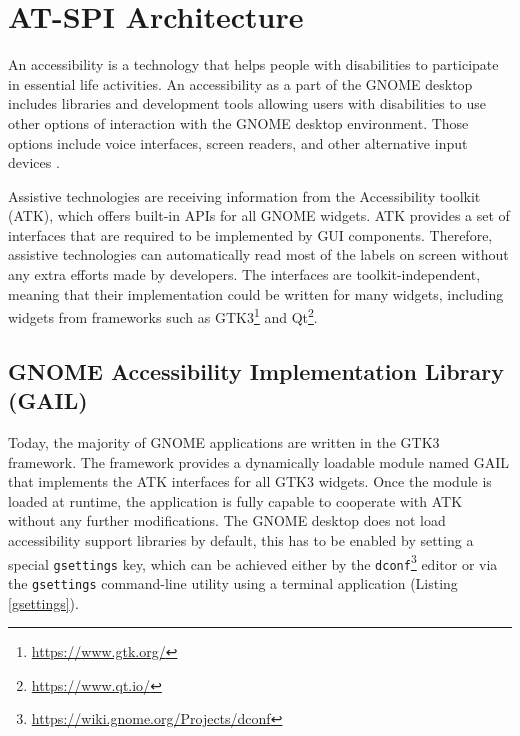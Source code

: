 
\chapter{AT-SPI Architecture}\label{chapter_2}
An accessibility is a technology that helps people with disabilities to participate in essential life activities. An accessibility as a part of the GNOME desktop includes libraries and development tools allowing users with disabilities to use other options of interaction with the GNOME desktop environment. Those options include voice interfaces, screen readers, and other alternative input devices \cite{gnomeADG}.

Assistive technologies are receiving information from the Accessibility toolkit (ATK), which offers built-in APIs for all GNOME widgets. ATK provides a set of interfaces that are required to be implemented by GUI components. Therefore, assistive technologies can automatically read most of the labels on screen without any extra efforts made by developers. The interfaces are toolkit-independent, meaning that their implementation could be written for many widgets, including widgets from frameworks such as GTK3\footnote{\url{https://www.gtk.org/}} and Qt\footnote{\url{https://www.qt.io/}}.

\section{GNOME Accessibility Implementation Library (GAIL)}
Today, the majority of GNOME applications are written in the GTK3 framework. The framework provides a dynamically loadable module named GAIL that implements the ATK interfaces for all GTK3 widgets. Once the module is loaded at runtime, the application is fully capable to cooperate with ATK without any further modifications.
The GNOME desktop does not load accessibility support libraries by default, this has to be enabled by setting a special \texttt{gsettings} key, which can be achieved either by the \texttt{dconf}\footnote{\url{https://wiki.gnome.org/Projects/dconf}} editor or via the \texttt{gsettings} command-line utility using a terminal application (Listing \ref{gsettings}).

